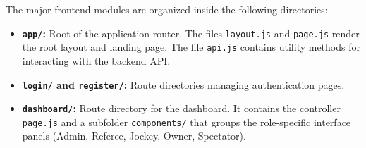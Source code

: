 The major frontend modules are organized inside the following directories:
\begin{itemize}
    \item \textbf{\texttt{app/}:} Root of the application router. The files \texttt{layout.js} and \texttt{page.js} render the root layout and landing page. The file \texttt{api.js} contains utility methods for interacting with the backend API.
    \item \textbf{\texttt{login/} and \texttt{register/}:} Route directories managing authentication pages.
    \item \textbf{\texttt{dashboard/}:} Route directory for the dashboard. It contains the controller \texttt{page.js} and a subfolder \texttt{components/} that groups the role-specific interface panels (Admin, Referee, Jockey, Owner, Spectator).
\end{itemize}
